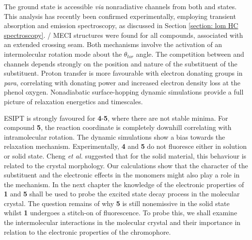 The ground state is accessible \textit{via} nonradiative channels from both \Estar{} and \Kstar{} states. This analysis has recently been confirmed experimentally,  employing transient absorption and emission spectroscopy, as discussed in Section \ref{section: lom HC spectroscopy}.\cite{Song2018,Zahid2017} \sone/\szero{} MECI structures were found for all compounds, associated with an extended crossing seam. Both mechanisms involve the activation of an intermolecular rotation mode about the $\theta_{tor}$ angle. The competition between \Estar{} and \Kstar{} channels depends strongly on the position and nature of the substituent of the substituent. Proton transfer is more favourable with electron donating groups in \textit{para}, correlating with donating power and increased electron density loss at the phenol oxygen. Nonadiabatic surface-hopping dynamic simulations provide a full picture of relaxation energetics and timescales. 

ESIPT is strongly favoured for \textbf{4}-\textbf{5}, where there are not stable \Estar{} minima. For compound \textbf{5}, the reaction coordinate is completely downhill correlating with intramolecular rotation. The dynamic simulations show a bias towards the \Kstar{} relaxation mechanism. Experimentally, \textbf{4} and \textbf{5} do not fluoresce either in solution or solid state. Cheng \textit{et al.} suggested that for the solid material, this behaviour is related to the crystal morphology.\cite{Cheng2015} Our calculations show that the character of the substituent and the electronic effects in the monomers might also play a role in the mechanism. In the next chapter the knowledge of the electronic properties of \textbf{1} and \textbf{5} shall be used to probe the excited state decay process in the molecular crystal. The question remains of why \textbf{5} is still nonemissive in the solid state whilst \textbf{1} undergoes a stitch-on of fluorescence. To probe this, we shall examine the intermolecular interactions in the molecular crystal and their importance in relation to the electronic properties of the chromophore. 



